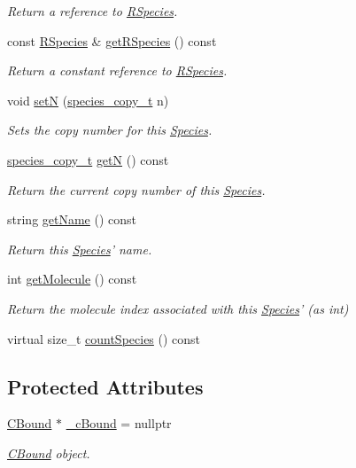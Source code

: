 \begin{DoxyCompactItemize}
\begin{DoxyCompactList}\small\item\em Return a reference to \hyperlink{classRSpecies}{R\+Species}. \end{DoxyCompactList}\item 
const \hyperlink{classRSpecies}{R\+Species} \& \hyperlink{classSpecies_aa1069a34b360f84d186f48bd99f80971}{get\+R\+Species} () const 
\begin{DoxyCompactList}\small\item\em Return a constant reference to \hyperlink{classRSpecies}{R\+Species}. \end{DoxyCompactList}\item 
void \hyperlink{classSpecies_a88de7cf5130cb9cee2da3585374db654}{set\+N} (\hyperlink{common_8h_a3503f321fd36304ee274141275cca586}{species\+\_\+copy\+\_\+t} n)
\begin{DoxyCompactList}\small\item\em Sets the copy number for this \hyperlink{classSpecies}{Species}. \end{DoxyCompactList}\item 
\hyperlink{common_8h_a3503f321fd36304ee274141275cca586}{species\+\_\+copy\+\_\+t} \hyperlink{classSpecies_aea7327b3fed261c705b4d32b9973aa58}{get\+N} () const 
\begin{DoxyCompactList}\small\item\em Return the current copy number of this \hyperlink{classSpecies}{Species}. \end{DoxyCompactList}\item 
string \hyperlink{classSpecies_a28fa239dded841133760ff9c47af63a1}{get\+Name} () const 
\begin{DoxyCompactList}\small\item\em Return this \hyperlink{classSpecies}{Species}' name. \end{DoxyCompactList}\item 
int \hyperlink{classSpecies_a1ea8969c51bc69879891a408f9e197c7}{get\+Molecule} () const 
\begin{DoxyCompactList}\small\item\em Return the molecule index associated with this \hyperlink{classSpecies}{Species}' (as int) \end{DoxyCompactList}\item 
virtual size\+\_\+t \hyperlink{classSpecies_a1864e111fe0304ca8d6b2d0d955a7356}{count\+Species} () const 
\end{DoxyCompactItemize}
\subsection*{Protected Attributes}
\begin{DoxyCompactItemize}
\item 
\hyperlink{classCBound}{C\+Bound} $\ast$ \hyperlink{classSpeciesBound_aac440237801e6a4cb29be223cf8905db}{\+\_\+c\+Bound} = nullptr
\begin{DoxyCompactList}\small\item\em \hyperlink{classCBound}{C\+Bound} object. \end{DoxyCompactList}\end{DoxyCompactItemize}


